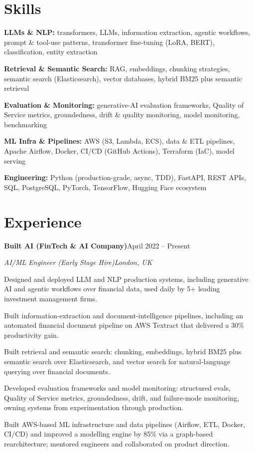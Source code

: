 \documentclass[10pt,a4paper]{article}
\newcommand{\entry}[4]{%
  {\color{company}\bfseries #1}\hfill {\color{muted}#2}\par
  \vspace{1pt}
  {\itshape #3}\hfill {\color{muted}\itshape #4}\par
  \vspace{3pt}%
}
\begin{document}
\section{Skills}
\begin{tight}
  \item[\textcolor{accent}{\small$\bullet$}] \textbf{LLMs \& NLP:} transformers, LLMs, information extraction, agentic workflows, prompt \& tool-use patterns, transformer fine-tuning (LoRA, BERT), classification, entity extraction
  \item[\textcolor{accent}{\small$\bullet$}] \textbf{Retrieval \& Semantic Search:} RAG, embeddings, chunking strategies, semantic search (Elasticsearch), vector databases, hybrid BM25 plus semantic retrieval
  \item[\textcolor{accent}{\small$\bullet$}] \textbf{Evaluation \& Monitoring:} generative-AI evaluation frameworks, Quality of Service metrics, groundedness, drift \& quality monitoring, model monitoring, benchmarking
  \item[\textcolor{accent}{\small$\bullet$}] \textbf{ML Infra \& Pipelines:} AWS (S3, Lambda, ECS), data \& ETL pipelines, Apache Airflow, Docker, CI/CD (GitHub Actions), Terraform (IaC), model serving
  \item[\textcolor{accent}{\small$\bullet$}] \textbf{Engineering:} Python (production-grade, async, TDD), FastAPI, REST APIs, SQL, PostgreSQL, PyTorch, TensorFlow, Hugging Face ecosystem
\end{tight}

\section{Experience}
\entry{Built AI (FinTech \& AI Company)}{April 2022 -- Present}{AI/ML Engineer (Early Stage Hire)}{London, UK}
\begin{tight}
  \item Designed and deployed LLM and NLP production systems, including generative AI and agentic workflows over financial data, used daily by 5+ leading investment management firms.
  \item Built information-extraction and document-intelligence pipelines, including an automated financial document pipeline on AWS Textract that delivered a 30\% productivity gain.
  \item Built retrieval and semantic search: chunking, embeddings, hybrid BM25 plus semantic search over Elasticsearch, and vector search for natural-language querying over financial documents.
  \item Developed evaluation frameworks and model monitoring: structured evals, Quality of Service metrics, groundedness, drift, and failure-mode monitoring, owning systems from experimentation through production.
  \item Built AWS-based ML infrastructure and data pipelines (Airflow, ETL, Docker, CI/CD) and improved a modelling engine by 85\% via a graph-based rearchitecture; mentored engineers and collaborated on product direction.
\end{tight}
\end{document}
